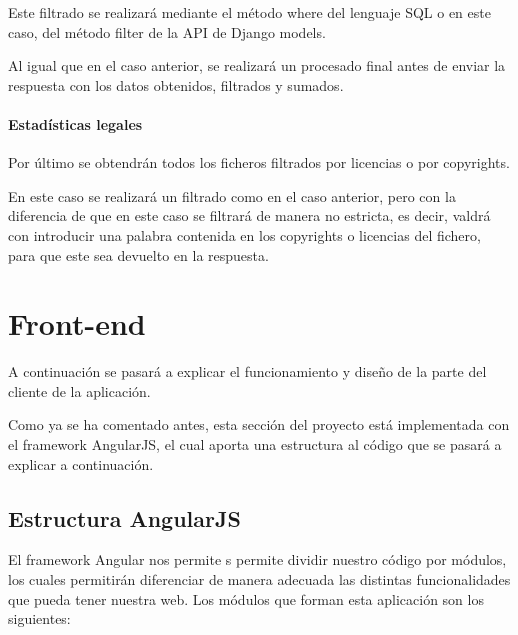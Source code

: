 \documentclass[a4paper, spanish, 12pt]{book}
\begin{document}
Este filtrado se realizar\'a mediante el m\'etodo where del lenguaje SQL o en este
caso, del m\'etodo filter de la API de Django models.

Al igual que en el caso anterior, se realizar\'a un procesado final antes de enviar
la respuesta con los datos obtenidos, filtrados y sumados.

\paragraph*{Estad\'isticas legales}
\label{paragraph:legal_stats}

Por \'ultimo se obtendr\'an todos los ficheros filtrados por licencias o por
copyrights.

En este caso se realizar\'a un filtrado como en el caso anterior, pero con la
diferencia de que en este caso se filtrar\'a de manera no estricta, es decir,
valdr\'a con introducir una palabra contenida en los copyrights o licencias del fichero,
para que este sea devuelto en la respuesta.


\section{Front-end}
\label{sec:front-end}

A continuaci\'on se pasar\'a a explicar el funcionamiento y dise\~no de la parte
del cliente de la aplicaci\'on.

Como ya se ha comentado antes, esta secci\'on del proyecto est\'a implementada
con el framework AngularJS, el cual aporta una estructura al c\'odigo que se
pasar\'a a explicar a continuaci\'on.

\subsection{Estructura AngularJS}
\label{subsec:angular_structure}

El framework Angular nos permite s permite dividir nuestro c\'odigo por m\'odulos, los
cuales permitir\'an diferenciar de manera adecuada las distintas funcionalidades
que pueda tener nuestra web. Los m\'odulos que forman esta aplicaci\'on son los
siguientes:
\end{document}
